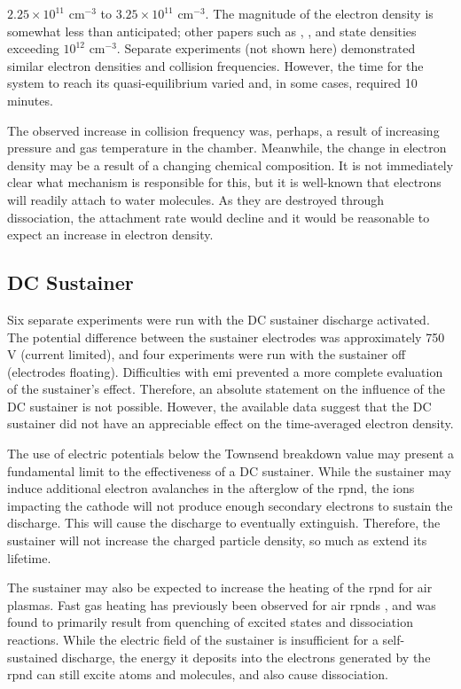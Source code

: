 $2.25\times 10^{11}$ cm$^{-3}$ to $3.25\times 10^{11}$ cm$^{-3}$. The magnitude
of the electron density is somewhat less than anticipated; other papers such as
\cite{Aleksandrov2007}, \cite{Pancheshnyi1999}, and \cite{Macheret2006} state
densities exceeding $10^{12}$ cm$^{-3}$. Separate experiments (not shown here)
demonstrated similar electron densities and collision frequencies. However, the
time for the system to reach its quasi-equilibrium varied and, in some cases,
required 10 minutes.

The observed increase in collision frequency was, perhaps, a result of
increasing pressure and gas temperature in the chamber. Meanwhile, the change in
electron density may be a result of a changing chemical composition. It is not
immediately clear what mechanism is responsible for this, but it is well-known
that electrons will readily attach to water molecules. As they are destroyed
through dissociation, the attachment rate would decline and it would be
reasonable to expect an increase in electron density.

\subsection{DC Sustainer}

Six separate experiments were run with the DC sustainer discharge activated. The
potential difference between the sustainer electrodes was approximately 750 V
(current limited), and four experiments were run with the sustainer off
(electrodes floating). Difficulties with \acs{emi} prevented a more complete
evaluation of the sustainer's effect. Therefore, an absolute statement on the
influence of the DC sustainer is not possible. However, the available data
suggest that the DC sustainer did not have an appreciable effect on the
time-averaged electron density.

The use of electric potentials below the Townsend breakdown value may present a
fundamental limit to the effectiveness of a DC sustainer. While the sustainer
may induce additional electron avalanches in the afterglow of the \acs{rpnd},
the ions impacting the cathode will not produce enough secondary electrons to
sustain the discharge. This will cause the discharge to eventually extinguish.
Therefore, the sustainer will not increase the charged particle density, so much
as extend its lifetime.

The sustainer may also be expected to increase the heating of the \acs{rpnd} for
air plasmas. Fast gas heating has previously been observed for air \acs{rpnd}s
\cite{Mintoussov2011}, and was found to primarily result from quenching of
excited states and dissociation reactions. While the electric field of the
sustainer is insufficient for a self-sustained discharge, the energy it deposits
into the electrons generated by the \acs{rpnd} can still excite atoms and
molecules, and also cause dissociation.

